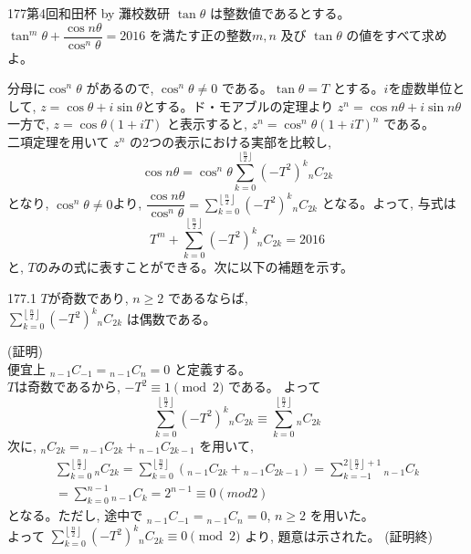 \begin{prob}{177}{}{第4回和田杯 by 灘校数研}
 $\tan{\theta}$ は整数値であるとする。\\
 $\tan^m{\theta}+\dfrac{\cos{n\theta}}{\cos^n{\theta}}=2016$ を満たす正の整数$m,n$ 及び $\tan{\theta}$ の値をすべて求めよ。
\end{prob}
分母に$\cos^n{\theta}$ があるので, $\cos^n{\theta}\neq 0$ である。$\tan{\theta}=T$ とする。$i$を虚数単位として, $z=\cos{\theta}+i\sin{\theta}$とする。ド・モアブルの定理より $z^n=\cos{n\theta}+i\sin{n\theta}$\\
一方で, $z=\cos{\theta}\left(1+iT\right)$ と表示すると, $z^n=\cos^n{\theta}\left(1+iT \right)^n $ である。\\
二項定理を用いて $z^n$ の2つの表示における実部を比較し,
\[\cos{n\theta}=\cos^n{\theta}\displaystyle\sum_{k=0}^{\lfloor\frac{n}{2}\rfloor} (-T^2)^k{}_nC_{2k}\]
となり, $\cos^n{\theta}\neq 0$より, $\dfrac{\cos{n\theta}}{\cos^n{\theta}} = \displaystyle\sum_{k=0}^{\left\lfloor\frac{n}{2}\right\rfloor} (-T^2)^k{}_nC_{2k}$ となる。よって, 与式は
\[T^m+\displaystyle\sum_{k=0}^{\left\lfloor\frac{n}{2}\right\rfloor} (-T^2)^k{}_nC_{2k}=2016\] と, $T$のみの式に表すことができる。次に以下の補題を示す。

\begin{subthm}{177.1}
  $T$が奇数であり, $n\ge 2$ であるならば, \\
 $\displaystyle\sum_{k=0}^{\left\lfloor\frac{n}{2}\right\rfloor} (-T^2)^k{}_nC_{2k}$ は偶数である。
\end{subthm}

(証明) \\
便宜上 ${}_{n-1}C_{-1}={}_{n-1}C_{n}=0$ と定義する。\\
$T$は奇数であるから, $-T^2\equiv 1 \pmod{2}$ である。 よって
\[ \sum_{k=0}^{\left\lfloor\frac{n}{2}\right\rfloor} (-T^2)^k{}_nC_{2k}\equiv \displaystyle\sum_{k=0}^{\left\lfloor\frac{n}{2}\right\rfloor} {}_nC_{2k} \]
次に, ${}_nC_{2k} ={}_{n-1}C_{2k}+{}_{n-1}C_{2k-1}$ を用いて, 
\begin{eqnarray*}
 \displaystyle\sum_{k=0}^{\left\lfloor\frac{n}{2}\right\rfloor} {}_nC_{2k} =\displaystyle\sum_{k=0}^{\left\lfloor\frac{n}{2}\right\rfloor} ({}_{n-1}C_{2k}+{}_{n-1}C_{2k-1} )= \displaystyle\sum_{k=-1}^{2\left\lfloor\frac{n}{2} \right\rfloor +1} {}_{n-1}C_{k} \\
= \displaystyle\sum_{k=0}^{n-1} {}_{n-1}C_{k} =2^{n-1} \equiv 0 (mod 2)
\end{eqnarray*}
となる。ただし, 途中で ${}_{n-1}C_{-1}={}_{n-1}C_{n}=0$, $n\ge 2$ を用いた。\\
よって $\displaystyle\sum_{k=0}^{\left\lfloor\frac{n}{2}\right\rfloor} (-T^2)^k{}_nC_{2k}\equiv 0 \pmod{2}$ より, 題意は示された。   (証明終)

